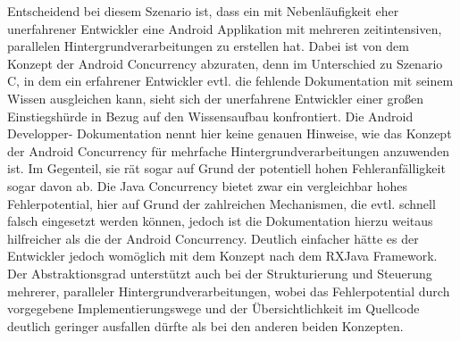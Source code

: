 \documentclass[12pt,oneside,a4paper,bibtotoc,liststotoc]{scrreprt}
\begin{document}
Entscheidend bei diesem Szenario ist, dass ein mit Nebenläufigkeit eher unerfahrener Entwickler eine Android Applikation mit mehreren zeitintensiven, parallelen Hintergrundverarbeitungen zu erstellen hat. Dabei ist von dem Konzept der Android Concurrency abzuraten, denn im Unterschied zu Szenario C, in dem ein erfahrener Entwickler evtl. die fehlende Dokumentation mit seinem Wissen ausgleichen kann, sieht sich der unerfahrene Entwickler einer großen Einstiegshürde in Bezug auf den Wissensaufbau konfrontiert. Die Android Developper- Dokumentation nennt hier keine genauen Hinweise, wie das Konzept der Android Concurrency für mehrfache Hintergrundverarbeitungen anzuwenden ist. Im Gegenteil, sie rät sogar auf Grund der potentiell hohen Fehleranfälligkeit sogar davon ab. Die Java Concurrency bietet zwar ein vergleichbar hohes Fehlerpotential, hier auf Grund der zahlreichen Mechanismen, die evtl. schnell falsch eingesetzt werden können, jedoch ist die Dokumentation hierzu weitaus hilfreicher als die der Android Concurrency. Deutlich einfacher hätte es der Entwickler jedoch womöglich mit dem Konzept nach dem RXJava Framework. Der Abstraktionsgrad unterstützt auch bei der Strukturierung und Steuerung mehrerer, paralleler Hintergrundverarbeitungen, wobei das Fehlerpotential durch vorgegebene Implementierungswege und der Übersichtlichkeit im Quellcode deutlich geringer ausfallen dürfte als bei den anderen beiden Konzepten.
\end{document}
